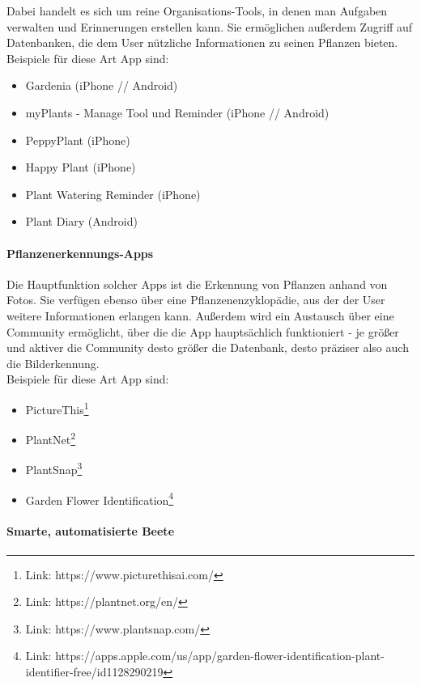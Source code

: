 Dabei handelt es sich um reine Organisations-Tools, in denen man
Aufgaben verwalten und Erinnerungen erstellen kann. Sie ermöglichen
außerdem Zugriff auf Datenbanken, die dem User nützliche Informationen
zu seinen Pflanzen bieten.\\
Beispiele für diese Art App sind:

\begin{itemize}
\tightlist
\item
  Gardenia (iPhone // Android)
\item
  myPlants - Manage Tool und Reminder (iPhone // Android)
\item
  PeppyPlant (iPhone)
\item
  Happy Plant (iPhone)
\item
  Plant Watering Reminder (iPhone)
\item
  Plant Diary (Android)
\end{itemize}

\hypertarget{pflanzenerkennungs-apps}{%
\paragraph{Pflanzenerkennungs-Apps}\label{pflanzenerkennungs-apps}}

Die Hauptfunktion solcher Apps ist die Erkennung von Pflanzen anhand von
Fotos. Sie verfügen ebenso über eine Pflanzenenzyklopädie, aus der der
User weitere Informationen erlangen kann. Außerdem wird ein Austausch
über eine Community ermöglicht, über die die App hauptsächlich
funktioniert - je größer und aktiver die Community desto größer die
Datenbank, desto präziser also auch die Bilderkennung.\\
Beispiele für diese Art App sind:

\begin{itemize}
\tightlist
\item
  PictureThis\footnote{Link: https://www.picturethisai.com/}
\item
  PlantNet\footnote{Link: https://plantnet.org/en/}
\item
  PlantSnap\footnote{Link: https://www.plantsnap.com/}
\item
  Garden Flower Identification\footnote{Link:
    https://apps.apple.com/us/app/garden-flower-identification-plant-identifier-free/id1128290219}
\end{itemize}

\hypertarget{smarte-automatisierte-beete}{%
\paragraph{Smarte, automatisierte
Beete}\label{smarte-automatisierte-beete}}


